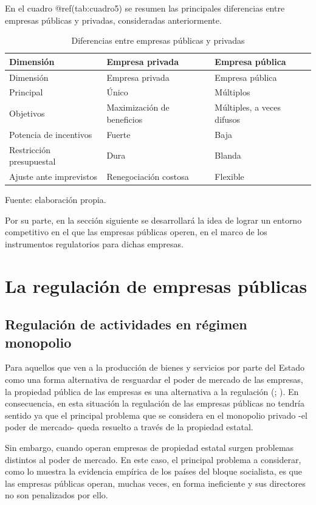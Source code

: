 \documentclass[
  12pt,
  spanish,
]{book}
\begin{document}
En el cuadro @ref(tab:cuadro5) se resumen las principales diferencias
entre empresas públicas y privadas, consideradas anteriormente.

\begin{longtable}[]{@{}lll@{}}
\caption{Diferencias entre empresas públicas y privadas}\tabularnewline
\toprule
Dimensión & Empresa privada & Empresa pública\tabularnewline
\midrule
\endfirsthead
\toprule
Dimensión & Empresa privada & Empresa pública\tabularnewline
\midrule
\endhead
Principal & Único & Múltiplos\tabularnewline
Objetivos & Maximización de beneficios & Múltiples, a veces
difusos\tabularnewline
Potencia de incentivos & Fuerte & Baja\tabularnewline
Restricción presupuestal & Dura & Blanda\tabularnewline
Ajuste ante imprevistos & Renegociación costosa &
Flexible\tabularnewline
\bottomrule
\end{longtable}

Fuente: elaboración propia.

Por su parte, en la sección siguiente se desarrollará la idea de lograr
un entorno competitivo en el que las empresas públicas operen, en el
marco de los instrumentos regulatorios para dichas empresas.

\hypertarget{la-regulaciuxf3n-de-empresas-puxfablicas}{%
\section{La regulación de empresas
públicas}\label{la-regulaciuxf3n-de-empresas-puxfablicas}}

\hypertarget{regulaciuxf3n-de-actividades-en-ruxe9gimen-monopolio}{%
\subsection{Regulación de actividades en régimen
monopolio}\label{regulaciuxf3n-de-actividades-en-ruxe9gimen-monopolio}}

Para aquellos que ven a la producción de bienes y servicios por parte
del Estado como una forma alternativa de resguardar el poder de mercado
de las empresas, la propiedad pública de las empresas es una alternativa
a la regulación (\citet{Shleifer2005}; \citet{Viscusi2005}). En
consecuencia, en esta situación la regulación de las empresas públicas
no tendría sentido ya que el principal problema que se considera en el
monopolio privado -el poder de mercado- queda resuelto a través de la
propiedad estatal.

Sin embargo, cuando operan empresas de propiedad estatal surgen
problemas distintos al poder de mercado. En este caso, el principal
problema a considerar, como lo muestra la evidencia empírica de los
países del bloque socialista, es que las empresas públicas operan,
muchas veces, en forma ineficiente y sus directores no son penalizados
por ello.
\end{document}
